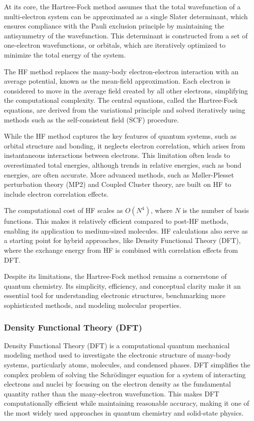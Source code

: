 At its core, the Hartree-Fock method assumes that the total wavefunction of a multi-electron system can be approximated as a single Slater determinant, which ensures compliance with the Pauli exclusion principle by maintaining the antisymmetry of the wavefunction. This determinant is constructed from a set of one-electron wavefunctions, or orbitals, which are iteratively optimized to minimize the total energy of the system.

The HF method replaces the many-body electron-electron interaction with an average potential, known as the mean-field approximation. Each electron is considered to move in the average field created by all other electrons, simplifying the computational complexity. The central equations, called the Hartree-Fock equations, are derived from the variational principle and solved iteratively using methods such as the self-consistent field (SCF) procedure.

While the HF method captures the key features of quantum systems, such as orbital structure and bonding, it neglects electron correlation, which arises from instantaneous interactions between electrons. This limitation often leads to overestimated total energies, although trends in relative energies, such as bond energies, are often accurate. More advanced methods, such as Møller-Plesset perturbation theory (MP2) and Coupled Cluster theory, are built on HF to include electron correlation effects.

The computational cost of HF scales as $O(N^4)$, where $N$ is the number of basis functions. This makes it relatively efficient compared to post-HF methods, enabling its application to medium-sized molecules. HF calculations also serve as a starting point for hybrid approaches, like Density Functional Theory (DFT), where the exchange energy from HF is combined with correlation effects from DFT.

Despite its limitations, the Hartree-Fock method remains a cornerstone of quantum chemistry. Its simplicity, efficiency, and conceptual clarity make it an essential tool for understanding electronic structures, benchmarking more sophisticated methods, and modeling molecular properties.
\subsubsection{Density Functional Theory (DFT)}

Density Functional Theory (DFT) is a computational quantum mechanical modeling method used to investigate the electronic structure of many-body systems, particularly atoms, molecules, and condensed phases. DFT simplifies the complex problem of solving the Schrödinger equation for a system of interacting electrons and nuclei by focusing on the electron density as the fundamental quantity rather than the many-electron wavefunction. This makes DFT computationally efficient while maintaining reasonable accuracy, making it one of the most widely used approaches in quantum chemistry and solid-state physics.

